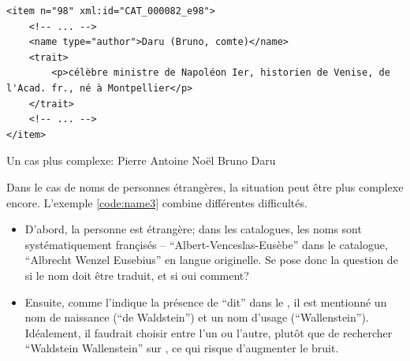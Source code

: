 \begin{listing}
	\begin{verbatim}
<item n="98" xml:id="CAT_000082_e98">
	<!-- ... -->
	<name type="author">Daru (Bruno, comte)</name>
	<trait>
		<p>célèbre ministre de Napoléon Ier, historien de Venise, de l'Acad. fr., né à Montpellier</p>
	</trait>
	<!-- ... -->
</item>
	\end{verbatim}
	\caption{Un cas plus complexe: Pierre Antoine Noël Bruno Daru}
	\label{code:name2}
\end{listing}

Dans le cas de noms de personnes étrangères, la situation peut être plus complexe encore. L'exemple \ref{code:name3} combine différentes difficultés.
\begin{itemize}
	\item D'abord, la personne est étrangère; dans les catalogues, les noms sont systématiquement françisés -- \enquote{Albert-Venceslas-Eusèbe} dans le catalogue, \enquote{Albrecht Wenzel Eusebius} en langue originelle. Se pose donc la question de si le nom doit être traduit, et si oui comment? 
	\item Ensuite, comme l'indique la présence de \enquote{dit} dans le \tname{}, il est mentionné un nom de naissance (\enquote{de Waldstein}) et un nom d'usage (\enquote{Wallenstein}). Idéalement, il faudrait choisir entre l'un ou l'autre, plutôt que de rechercher \enquote{Waldstein Wallenstein} sur \wkd{}, ce qui risque d'augmenter le bruit. 
\end{itemize}

